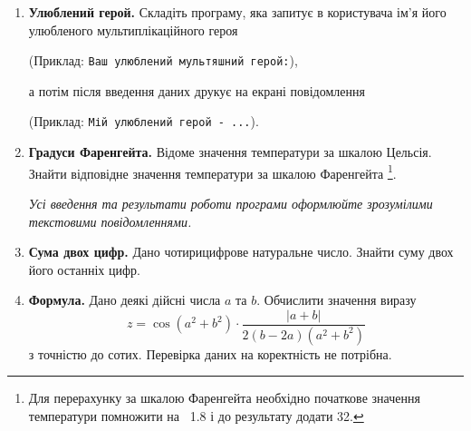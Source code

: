 \begin{enumerate}

\item \textbf{Улюблений герой.} Складіть програму, яка запитує в користувача ім'я його улюбленого мультиплікаційного героя

(Приклад: \verb|Ваш улюблений мультяшний герой:|),

а потім після введення даних друкує на екрані повідомлення

(Приклад: \verb|Мій улюблений герой - ...|).

\item \textbf{Градуси Фаренгейта.} Відоме значення температури за шкалою Цельсія. Знайти відповідне
значення температури за шкалою Фаренгейта \footnote{Для перерахунку за шкалою Фаренгейта необхідно початкове значення температури помножити на ~1.8 і до результату додати 32.}.

{\itshape Усі введення та результати роботи програми оформлюйте зрозумілими текстовими повідомленнями.}

\item \textbf{Сума двох цифр.} Дано чотирицифрове натуральне число. Знайти суму двох його останніх цифр.

\item \textbf{Формула.} Дано деякі дійсні числа $a$ та $b$. Обчислити значення виразу
$$
z=\cos(a^2+b^2)\cdot\dfrac{|a+b|}{2(b-2a)(a^2+b^2)}
$$
з точністю до сотих. Перевірка даних на коректність не потрібна.
\end{enumerate}




